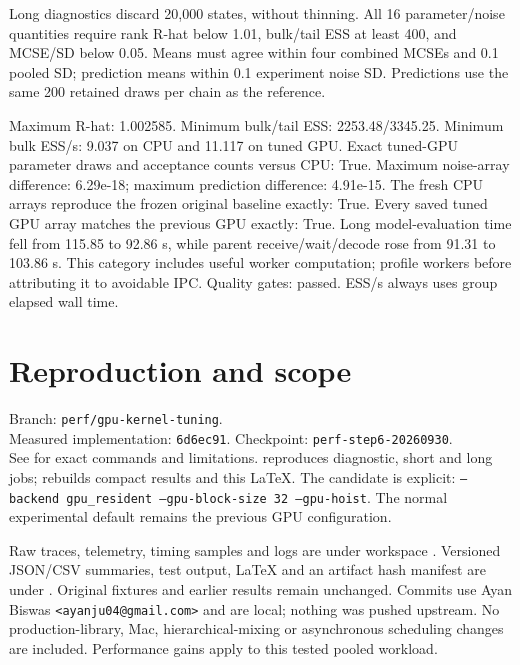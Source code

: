 \documentclass[11pt]{article}
\begin{document}
Long diagnostics discard 20,000 states, without thinning. All 16 parameter/noise
quantities require rank R-hat below 1.01, bulk/tail ESS at least 400, and MCSE/SD
below 0.05. Means must agree within four combined MCSEs and 0.1 pooled SD;
prediction means within 0.1 experiment noise SD. Predictions use the same 200
retained draws per chain as the reference.

Maximum R-hat: 1.002585. Minimum bulk/tail ESS: 2253.48/3345.25.
Minimum bulk ESS/s: 9.037 on CPU and 11.117 on tuned GPU.
Exact tuned-GPU parameter draws and acceptance counts versus CPU: True.
Maximum noise-array difference: 6.29e-18; maximum prediction difference: 4.91e-15.
The fresh CPU arrays reproduce the frozen original baseline exactly: True.
Every saved tuned GPU array matches the previous GPU exactly: True.
Long model-evaluation time fell from 115.85 to 92.86 s, while parent
receive/wait/decode rose from 91.31 to 103.86 s. This category includes useful
worker computation; profile workers before attributing it to avoidable IPC.
Quality gates: passed. ESS/s always uses group elapsed wall time.
\section*{Reproduction and scope}
\begingroup\raggedright
Branch: \texttt{perf/gpu-kernel-tuning}.\\
Measured implementation: \texttt{6d6ec91}. Checkpoint: \texttt{perf-step6-20260930}.\\
See  for exact commands and limitations.
 reproduces diagnostic, short and long jobs;
 rebuilds compact results and this LaTeX.
The candidate is explicit: \texttt{--backend gpu\_resident --gpu-block-size 32 --gpu-hoist}.
The normal experimental default remains the previous GPU configuration.

Raw traces, telemetry, timing samples and logs are under workspace
. Versioned JSON/CSV summaries, test output, LaTeX
and an artifact hash manifest are under .
Original fixtures and earlier results remain unchanged. Commits use Ayan Biswas
\texttt{<ayanju04@gmail.com>} and are local; nothing was pushed upstream.
No production-library, Mac, hierarchical-mixing or asynchronous scheduling changes
are included. Performance gains apply to this tested pooled workload.
\par\endgroup
\end{document}
